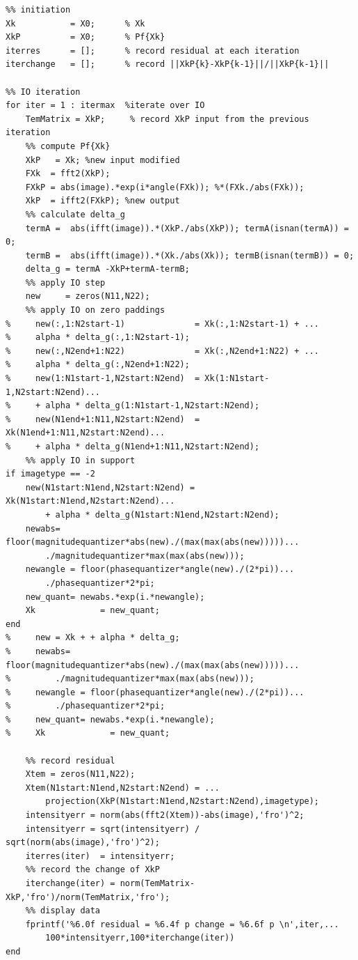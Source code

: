 \documentclass[letter,14pt]{extreport}
\begin{document}
\begin{appendices}
\begin{lstlisting}
%% initiation
Xk           = X0;      % Xk
XkP          = X0;      % Pf{Xk}
iterres      = [];      % record residual at each iteration
iterchange   = [];      % record ||XkP{k}-XkP{k-1}||/||XkP{k-1}||

%% IO iteration
for iter = 1 : itermax  %iterate over IO
    TemMatrix = XkP;     % record XkP input from the previous iteration
    %% compute Pf{Xk}
    XkP   = Xk; %new input modified
    FXk  = fft2(XkP);
    FXkP = abs(image).*exp(i*angle(FXk)); %*(FXk./abs(FXk));
    XkP  = ifft2(FXkP); %new output
    %% calculate delta_g
    termA =  abs(ifft(image)).*(XkP./abs(XkP)); termA(isnan(termA)) = 0;
    termB =  abs(ifft(image)).*(Xk./abs(Xk)); termB(isnan(termB)) = 0;
    delta_g = termA -XkP+termA-termB;
    %% apply IO step
    new     = zeros(N11,N22);
    %% apply IO on zero paddings
%     new(:,1:N2start-1)              = Xk(:,1:N2start-1) + ...
%     alpha * delta_g(:,1:N2start-1);
%     new(:,N2end+1:N22)              = Xk(:,N2end+1:N22) + ...
%     alpha * delta_g(:,N2end+1:N22);
%     new(1:N1start-1,N2start:N2end)  = Xk(1:N1start-1,N2start:N2end)...
%     + alpha * delta_g(1:N1start-1,N2start:N2end);
%     new(N1end+1:N11,N2start:N2end)  = Xk(N1end+1:N11,N2start:N2end)...
%     + alpha * delta_g(N1end+1:N11,N2start:N2end);
    %% apply IO in support
if imagetype == -2
    new(N1start:N1end,N2start:N2end) = Xk(N1start:N1end,N2start:N2end)...
        + alpha * delta_g(N1start:N1end,N2start:N2end);
    newabs= floor(magnitudequantizer*abs(new)./(max(max(abs(new)))))...
        ./magnitudequantizer*max(max(abs(new)));
    newangle = floor(phasequantizer*angle(new)./(2*pi))...
        ./phasequantizer*2*pi;
    new_quant= newabs.*exp(i.*newangle);
    Xk             = new_quant;
end
%     new = Xk + + alpha * delta_g;
%     newabs= floor(magnitudequantizer*abs(new)./(max(max(abs(new)))))...
%         ./magnitudequantizer*max(max(abs(new)));
%     newangle = floor(phasequantizer*angle(new)./(2*pi))...
%         ./phasequantizer*2*pi;
%     new_quant= newabs.*exp(i.*newangle);
%     Xk             = new_quant;

    %% record residual
    Xtem = zeros(N11,N22);
    Xtem(N1start:N1end,N2start:N2end) = ...
        projection(XkP(N1start:N1end,N2start:N2end),imagetype);
    intensityerr = norm(abs(fft2(Xtem))-abs(image),'fro')^2;
    intensityerr = sqrt(intensityerr) / sqrt(norm(abs(image),'fro')^2);
    iterres(iter)  = intensityerr;
    %% record the change of XkP
    iterchange(iter) = norm(TemMatrix-XkP,'fro')/norm(TemMatrix,'fro');
    %% display data
    fprintf('%6.0f residual = %6.4f p change = %6.6f p \n',iter,...
        100*intensityerr,100*iterchange(iter))
end


\end{lstlisting}
\end{appendices}
\end{document}
